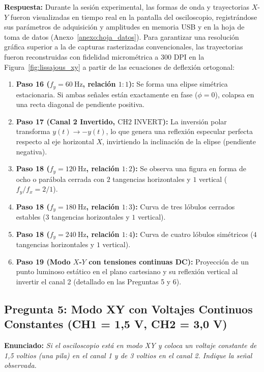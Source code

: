 \begin{appendices}
\textbf{Respuesta:} Durante la sesión experimental, las formas de onda y trayectorias $X$-$Y$ fueron visualizadas en tiempo real en la pantalla del osciloscopio, registrándose sus parámetros de adquisición y amplitudes en memoria USB y en la hoja de toma de datos (Anexo~\ref{anexo:hoja_datos}). Para garantizar una resolución gráfica superior a la de capturas rasterizadas convencionales, las trayectorias fueron reconstruidas con fidelidad micrométrica a 300 DPI en la Figura~\ref{fig:lissajous_xy} a partir de las ecuaciones de deflexión ortogonal:
\begin{enumerate}
    \item \textbf{Paso 16 ($f_y = \qty{60}{\hertz}$, relación $1:1$):} Se forma una elipse simétrica estacionaria. Si ambas señales están exactamente en fase ($\phi = 0$), colapsa en una recta diagonal de pendiente positiva.
    \item \textbf{Paso 17 (Canal 2 Invertido, $\text{CH2 INVERT}$):} La inversión polar transforma $y(t) \to -y(t)$, lo que genera una reflexión especular perfecta respecto al eje horizontal $X$, invirtiendo la inclinación de la elipse (pendiente negativa).
    \item \textbf{Paso 18 ($f_y = \qty{120}{\hertz}$, relación $1:2$):} Se observa una figura en forma de ocho o parábola cerrada con $2$ tangencias horizontales y $1$ vertical ($f_y/f_x = 2/1$).
    \item \textbf{Paso 18 ($f_y = \qty{180}{\hertz}$, relación $1:3$):} Curva de tres lóbulos cerrados estables ($3$ tangencias horizontales y $1$ vertical).
    \item \textbf{Paso 18 ($f_y = \qty{240}{\hertz}$, relación $1:4$):} Curva de cuatro lóbulos simétricos ($4$ tangencias horizontales y $1$ vertical).
    \item \textbf{Paso 19 (Modo $X$-$Y$ con tensiones continuas DC):} Proyección de un punto luminoso estático en el plano cartesiano y su reflexión vertical al invertir el canal 2 (detallado en las Preguntas 5 y 6).
\end{enumerate}

\subsection{Pregunta 5: Modo XY con Voltajes Continuos Constantes (CH1 = 1,5 V, CH2 = 3,0 V)}
\textbf{Enunciado:} \textit{Si el osciloscopio está en modo XY y coloca un voltaje constante de 1,5 voltios (una pila) en el canal 1 y de 3 voltios en el canal 2. Indique la señal observada.}


\end{appendices}
